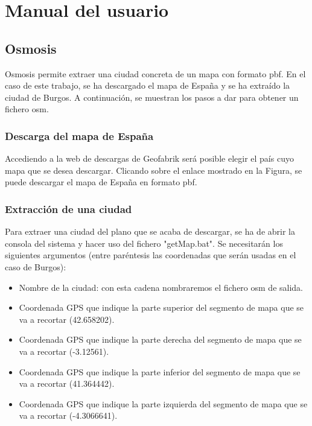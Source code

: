 \section{Manual del usuario}



\subsection{Osmosis}
Osmosis permite extraer una ciudad concreta de un mapa con formato pbf. En el caso de este trabajo, se ha descargado el mapa de España y se ha extraído la ciudad de Burgos. A continuación, se muestran los pasos a dar para obtener un fichero osm.

\subsubsection{Descarga del mapa de España}
Accediendo a la web de descargas de Geofabrik será posible elegir el país cuyo mapa que se desea descargar. Clicando sobre el enlace mostrado en la Figura, se puede descargar el mapa de España en formato pbf.

\subsubsection{Extracción de una ciudad}
Para extraer una ciudad del plano que se acaba de descargar, se ha de abrir la consola del sistema y hacer uso del fichero "getMap.bat". Se necesitarán los siguientes argumentos (entre paréntesis las coordenadas que serán usadas en el caso de Burgos):
\begin{itemize}
	\item Nombre de la ciudad: con esta cadena nombraremos el fichero osm de salida.
	\item Coordenada GPS que indique la parte superior del segmento de mapa que se va a recortar (42.658202).
	\item Coordenada GPS que indique la parte derecha del segmento de mapa que se va a recortar (-3.12561).
	\item Coordenada GPS que indique la parte inferior del segmento de mapa que se va a recortar (41.364442).
	\item Coordenada GPS que indique la parte izquierda del segmento de mapa que se va a recortar (-4.3066641).
\end{itemize}

